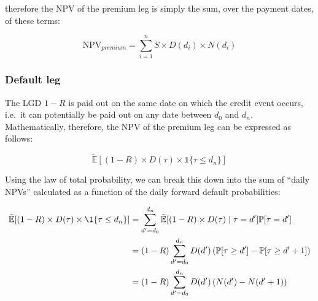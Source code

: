 \documentclass[11pt]{article}
\begin{document}
therefore the NPV of the premium leg is simply the sum, over the payment
dates, of these terms:

\[\textrm{NPV}_{premium} = \sum_{i=1}^{n} S \times D(d_i) \times N(d_i)\]

\subsubsection{Default leg}\label{default-leg}

The LGD \(1-R\) is paid out on the same date on which the credit event
occurs, i.e.~it can potentially be paid out on any date between \(d_0\)
and \(d_n\). Mathematically, therefore, the NPV of the premium leg can
be expressed as follows:

\[
\tilde{\mathbb{E}}[(1-R) \times D(\tau) \times \mathbb{1} \{\tau \leq d_n\} ]
\]

Using the law of total probability, we can break this down into the sum
of ``daily NPVs'' calculated as a function of the daily forward default
probabilities:

\[
\def\P{\mathbb{P}}
\begin{align*}
\tilde{\mathbb{E}}[(1-R) \times D(\tau) \times \1\set{\tau \leq d_n} ]
&= \sum_{d'=d_0}^{d_n} \tilde{\mathbb{E}}[ (1-R) \times D(\tau) \mid \tau = d'] \P[ \tau = d' ] \\
&= (1-R) \sum_{d'=d_0}^{d_n} D(d') \left( \P[ \tau \geq d' ] - \P[ \tau \geq d'+1 ] \right) \\
&= (1-R) \sum_{d'=d_0}^{d_n} D(d') \left( N(d') - N(d'+1) \right)
\end{align*}
\]
\end{document}
